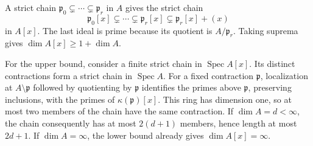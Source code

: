 A strict chain $\mathfrak p_0\subsetneq\cdots\subsetneq\mathfrak p_r$ in $A$ gives the strict chain
\[\mathfrak p_0[x]\subsetneq\cdots\subsetneq\mathfrak p_r[x]\subsetneq\mathfrak p_r[x]+(x)\]
in $A[x]$. The last ideal is prime because its quotient is $A/\mathfrak p_r$. Taking suprema gives $\dim A[x]\geq1+\dim A$.

For the upper bound, consider a finite strict chain in $\operatorname{Spec}A[x]$. Its distinct contractions form a strict chain in $\operatorname{Spec}A$. For a fixed contraction $\mathfrak p$, localization at $A\setminus\mathfrak p$ followed by quotienting by $\mathfrak p$ identifies the primes above $\mathfrak p$, preserving inclusions, with the primes of $\kappa(\mathfrak p)[x]$. This ring has dimension one, so at most two members of the chain have the same contraction. If $\dim A=d<\infty$, the chain consequently has at most $2(d+1)$ members, hence length at most $2d+1$. If $\dim A=\infty$, the lower bound already gives $\dim A[x]=\infty$.
